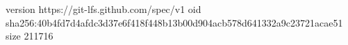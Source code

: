 version https://git-lfs.github.com/spec/v1
oid sha256:40b4fd7d4afdc3d37e6f418f448b13b00d904acb578d641332a9c23721acae51
size 211716
